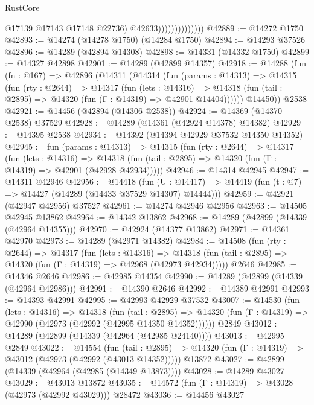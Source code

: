 \begin{lexlean}{RustCore}
\begin{coremodule}
                                  @17139
                                  @17143
                                  @17148
                                  @22736)
                                @42633))))))))))))))
@42889 := @14272 @1750
@42893 := @14274 (@14278 @1750) (@14284 @1750)
@42894 := @14293 @37526
@42896 := @14289 (@42894 @14308)
@42898 := @14331 (@14332 @1750)
@42899 := @14327 @42898
@42901 := @14289 (@42899 @14357)
@42918 := @14288
    (fun (fn : @167) =>
    @42896
      (@14311
        (@14314
          (fun (params : @14313) =>
          @14315
            (fun (rty : @2644) =>
            @14317
              (fun (lets : @14316) =>
              @14318 (fun (tail : @2895) => @14320 (fun (Γ : @14319) => @42901 @14404))))))
        @14450))
    @2538
@42921 := @14456 (@42894 (@14306 @2538))
@42924 := @14369 (@14370 @2538) @37529
@42928 := @14289 (@14361 (@42924 @14378) @14382)
@42929 := @14395 @2538
@42934 := @14392 (@14394 @42929 @37532 @14350 @14352)
@42945 := fun (params : @14313) =>
  @14315
    (fun (rty : @2644) =>
    @14317
      (fun (lets : @14316) =>
      @14318 (fun (tail : @2895) => @14320 (fun (Γ : @14319) => @42901 (@42928 @42934)))))
@42946 := @14314 @42945
@42947 := @14311 @42946
@42956 := @14418
    (fun (U : @14417) => @14419 (fun (t : @7) => @14427 (@14289 (@14433 @37529 @14307) @14444)))
@42959 := @42921 (@42947 @42956) @37527
@42961 := @14274 @42946 @42956
@42963 := @14505 @42945 @13862
@42964 := @14342 @13862
@42968 := @14289 (@42899 (@14339 (@42964 @14355)))
@42970 := @42924 (@14377 @13862)
@42971 := @14361 @42970
@42973 := @14289 (@42971 @14382)
@42984 := @14508
    (fun (rty : @2644) =>
    @14317
      (fun (lets : @14316) =>
      @14318 (fun (tail : @2895) => @14320 (fun (Γ : @14319) => @42968 (@42973 @42934)))))
    @2646
@42985 := @14346 @2646
@42986 := @42985 @14354
@42990 := @14289 (@42899 (@14339 (@42964 @42986)))
@42991 := @14390 @2646
@42992 := @14389 @42991
@42993 := @14393 @42991
@42995 := @42993 @42929 @37532
@43007 := @14530
    (fun (lets : @14316) =>
    @14318
      (fun (tail : @2895) =>
      @14320 (fun (Γ : @14319) => @42990 (@42973 (@42992 (@42995 @14350 @14352))))))
    @2849
@43012 := @14289 (@42899 (@14339 (@42964 (@42985 @24140))))
@43013 := @42995 @2849
@43022 := @14554
    (fun (tail : @2895) => @14320 (fun (Γ : @14319) => @43012 (@42973 (@42992 (@43013 @14352)))))
    @13872
@43027 := @42899 (@14339 (@42964 (@42985 (@14349 @13873))))
@43028 := @14289 @43027
@43029 := @43013 @13872
@43035 := @14572 (fun (Γ : @14319) => @43028 (@42973 (@42992 @43029))) @28472
@43036 := @14456 @43027

\end{coremodule}
\end{lexlean}
